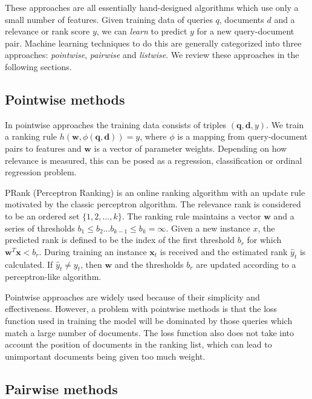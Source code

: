 \documentclass[english]{article}
\theoremstyle{definition}
\begin{document}
These approaches are all essentially hand-designed algorithms which use only a small number of features.  Given training data of queries $q$, documents $d$ and a relevance or rank score $y$, we can \textit{learn} to predict $y$ for a new query-document pair.  Machine learning techniques to do this are generally categorized into three approaches: \textit{pointwise}, \textit{pairwise} and \textit{listwise}.  We review these approaches in the following sections.

\subsection{Pointwise methods}

In pointwise approaches the training data consists of triples $(\mathbf{q}, \mathbf{d}, y)$.  We train a ranking rule $h(\mathbf{w}, \phi (\mathbf{q}, \mathbf{d})) = y$, where $\phi$ is a mapping from query-document pairs to features and $\mathbf{w}$ is a vector of parameter weights.  Depending on how relevance is measured, this can be posed as a regression, classification or ordinal regression problem.  

PRank \cite{crammer2001pranking} (Perceptron Ranking) is an online ranking algorithm with an update rule motivated by the classic perceptron algorithm.  The relevance rank is considered to be an ordered set $\{1, 2, \ldots, k \}$.  The ranking rule maintains a vector $\mathbf{w}$ and a series of thresholds $b_1 \le b_2 \ldots b_{k-1} \le b_k = \infty$.  Given a new instance $x$, the predicted rank is defined to be the index of the first threshold $b_r$ for which $\mathbf{w}^T \mathbf{x} < b_r$.  During training an instance $\mathbf{x}_t$ is received and the estimated rank $\hat{y}_t$ is calculated.  If $\hat{y}_t \ne y_t$, then $\mathbf{w}$ and the thresholds $b_r$ are updated according to a perceptron-like algorithm.  

Pointwise approaches are widely used because of their simplicity and effectiveness.  However, a problem with pointwise methods is that the loss function used in training the model will be dominated by those queries which match a large number of documents.  The loss function also does not take into account the position of documents in the ranking list, which can lead to unimportant documents being given too much weight.

\subsection{Pairwise methods}
\end{document}
